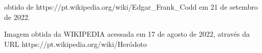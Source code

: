 \documentclass[
12pt,		%
openright,	%
twoside,  %
a4paper,			%
chapter=TITLE,		%
english,			%
french,				%
spanish,			%
brazil				%
]{USPSC-classe/USPSC}
\begin{document}
\begin{flushleft}
\begin{flushleft}
\begin{flushleft}
\begin{flushleft}
\begin{flushleft}
\begin{flushleft}
\begin{flushleft}
\begin{flushleft}
\begin{flushleft}
 obtido de https://pt.wikipedia.org/wiki/Edgar\_Frank\_Codd em 21 de setembro de 2022.
\end{flushleft}


\end{flushleft}


\end{flushleft}


\end{flushleft}


\end{flushleft}


\end{flushleft}


\end{flushleft}


\end{flushleft}


\end{flushleft}


\begin{flushleft}
\begin{flushleft}
\begin{flushleft}
\begin{flushleft}
\begin{flushleft}
\begin{flushleft}
\begin{flushleft}
\begin{flushleft}
\begin{flushleft}
[WIKIPEDIA, 2022] Imagem obtida da WIKIPEDIA acessada em 17 de agosto de 2022, atrav\'es da URL https://pt.wikipedia.org/wiki/Her\'odoto
\end{flushleft}


\end{flushleft}


\end{flushleft}


\end{flushleft}


\end{flushleft}


\end{flushleft}


\end{flushleft}


\end{flushleft}


\end{flushleft}
\end{document}
